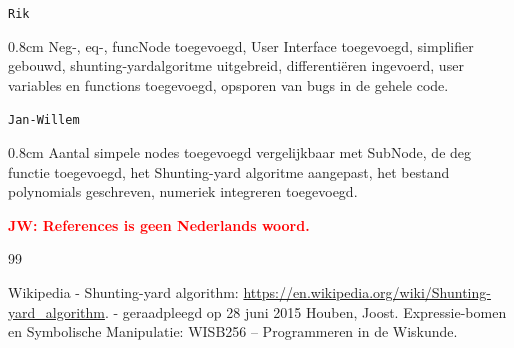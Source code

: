 \documentclass[a4paper]{article}
\newcommand{\rcom}[1]{\textbf{\textcolor{red}{#1}}}
\newcommand{\com}[2]{\texttt{#1}\mbox{}\vspace{-2ex}\begin{adjustwidth}{0.8cm}{} #2 \end{adjustwidth}}
\begin{document}
\com{Rik} {Neg-, eq-, funcNode toegevoegd, User Interface toegevoegd, simplifier gebouwd, shunting-yardalgoritme uitgebreid, differenti\"eren ingevoerd, user variables en functions toegevoegd, opsporen van bugs in de gehele code.}

\com{Jan-Willem} {Aantal simpele nodes toegevoegd vergelijkbaar met SubNode, de deg functie toegevoegd, het Shunting-yard algoritme aangepast, het bestand polynomials geschreven, numeriek integreren toegevoegd.}

\rcom{JW: References is geen Nederlands woord.}
\begin{thebibliography}{99}

 Wikipedia - Shunting-yard algorithm:
\url{https://en.wikipedia.org/wiki/Shunting-yard_algorithm}. 
 - geraadpleegd op 28 juni 2015
  Houben, Joost. Expressie-bomen en Symbolische Manipulatie: WISB256 – Programmeren in de Wiskunde.


\end{thebibliography}
\end{document}
